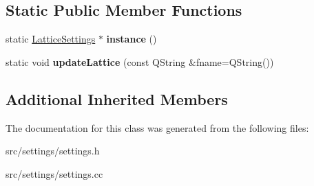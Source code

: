 \subsection*{Static Public Member Functions}
\begin{DoxyCompactItemize}
\item 
static \hyperlink{classsettings_1_1LatticeSettings}{Lattice\+Settings} $\ast$ {\bfseries instance} ()\hypertarget{classsettings_1_1LatticeSettings_a6c7a45857ec492e8295924cfb427336e}{}\label{classsettings_1_1LatticeSettings_a6c7a45857ec492e8295924cfb427336e}

\item 
static void {\bfseries update\+Lattice} (const Q\+String \&fname=Q\+String())\hypertarget{classsettings_1_1LatticeSettings_aa2018ab5eae604c135163a95abf42b53}{}\label{classsettings_1_1LatticeSettings_aa2018ab5eae604c135163a95abf42b53}

\end{DoxyCompactItemize}
\subsection*{Additional Inherited Members}


The documentation for this class was generated from the following files\+:\begin{DoxyCompactItemize}
\item 
src/settings/settings.\+h\item 
src/settings/settings.\+cc\end{DoxyCompactItemize}
